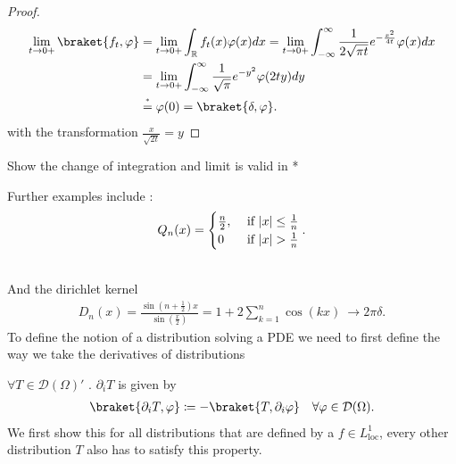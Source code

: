 \newpage
\begin{proof}
 \begin{align*}
   \lim_{t \to 0+} \braket{f_t,\phi } &= \lim_{t \to 0+} \int_\mathbb{R} f_t(x) \phi(x) dx = \lim_{t \to 0+} \int_{-\infty}^{\infty} \frac{1}{2 \sqrt{\pi  t} } e^{- \frac{x^2}{4t}}  \phi(x) dx \\
                                      &= \lim_{t \to 0+} \int_{-\infty}^{\infty} \frac{1}{\sqrt{\pi }} e^{-y^2}  \phi(2ty) dy \\
                                      &\myS{*}{=} \phi(0) = \braket{\delta ,\phi }
 .\end{align*} 
 with the transformation $\frac{x}{\sqrt{2t}} = y$
\end{proof}
\begin{exercise}
 Show the change of integration and limit is valid in * 
\end{exercise}
Further examples  include : 
\begin{align*}
  Q_n(x) = \begin{cases}
    \frac{n}{2} , &\text{ if }\lvert x\rvert \le  \frac{1}{n}\\
    0   &\text{ if } \lvert x\rvert > \frac{1}{n} 
  \end{cases}
.\end{align*}
\begin{figure}[H]
  \begin{center}
  \end{center}
\end{figure}
\hspace{0mm}\\
And the dirichlet kernel 
\begin{align*}
  D_n(x) = \frac{\sin(n+\frac{1}{2})x}{\sin(\frac{x}{2})} = 1+ 2\sum_{k=1}^{n}  \cos(kx)  \ \to 2\pi \delta 
.\end{align*} 
To define the notion of a distribution solving a PDE we need to first define the way we take the derivatives of distributions
\begin{definition}
  $\forall  T \in  \mathcal{D}(\Omega )'$ . $\partial_i T$ is given by  
  \begin{align*}
    \braket{\partial_i T, \phi } \coloneqq  - \braket{T,\partial_i \phi } \quad \forall  \phi  \in \mathcal{D}(\Omega )
  .\end{align*}
  We first show this for all distributions that are defined by a $f \in L_{\text{loc}}^{1} $, every other distribution $T$ also has to satisfy this property.
\end{definition}
